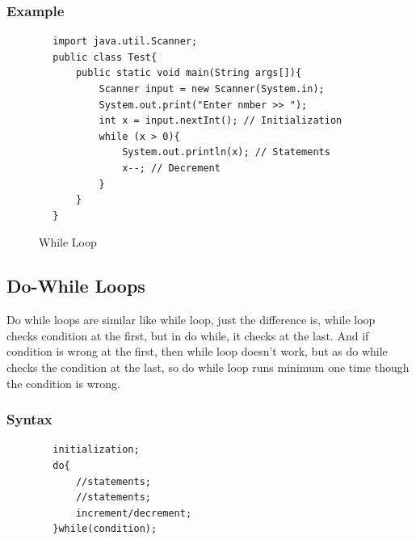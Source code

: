 \documentclass[openany]{book}  %
\begin{document}
\subsubsection{Example}
\begin{center}
    \footnotesize
    \begin{verbatim}
        import java.util.Scanner;
        public class Test{
            public static void main(String args[]){
                Scanner input = new Scanner(System.in);
                System.out.print("Enter nmber >> ");
                int x = input.nextInt(); // Initialization
                while (x > 0){
                    System.out.println(x); // Statements
                    x--; // Decrement
                }
            }
        }
    \end{verbatim}
\end{center}
% 
% 
\begin{figure}[htbp]
    \begin{center}
        \caption{While Loop\cite{Ref3}}
    \end{center}
\end{figure}

\newpage

% 
% 
\subsection{Do-While Loops}
Do while loops are similar like while loop, just the difference is, while loop  \\
checks condition at the first, but in do while, it checks at the last. And if \\
condition is wrong at the first, then while loop doesn't work, but as do while \\
checks the condition at the last, so do while loop runs minimum one time though \\
the condition is wrong.
% 
% 
\subsubsection{Syntax}
\begin{center}
    \begin{verbatim}
        initialization;
        do{
            //statements;
            //statements;
            increment/decrement;
        }while(condition);
    \end{verbatim}
\end{center}
% 
% 
\end{document}
